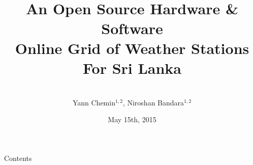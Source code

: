 \documentclass[xcolor=dvipsnames,beamer,unknownkeysallowed]{beamer} %
\title[IWMI - OSHW]
{\ \\
\ \\
An Open Source Hardware \& Software\\
Online Grid of Weather Stations\\
For Sri Lanka}
\author[Chemin, Bandara]
{\vspace{30pt}\\
Yann Chemin$^{1,2}$, Niroshan Bandara$^{1,2}$}
\institute[IWMI - U of Moratuwa]
{$^1$International Water Management Institute\\
 \vspace{5pt}
 $^2$University of Moratuwa - Town and Country Planning Department\\
\begin{center}
\end{center}
}
\date{\tiny May 15th, 2015}
\begin{document}
\begin{frame}
 \maketitle
\end{frame}

\begin{frame}{Contents}
 \begin{multicols}{2}
  \setcounter{tocdepth}{2}  
  \tableofcontents
 \end{multicols} 
\end{frame}

%
%
%
\end{document}
